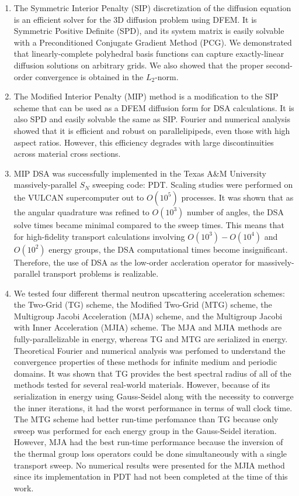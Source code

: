 \begin{enumerate}
\item The Symmetric Interior Penalty (SIP) discretization of the diffusion equation is an efficient solver for the 3D diffusion problem using DFEM. It is Symmetric Positive Definite (SPD), and its system matrix is easily solvable with a Preconditioned Conjugate Gradient Method (PCG). We demonstrated that linearly-complete polyhedral basis functions can capture exactly-linear diffusion solutions on arbitrary grids. We also showed that the proper second-order convergence is obtained in the $L_2$-norm.
\item The Modified Interior Penalty (MIP) method is a modification to the SIP scheme that can be used as a DFEM diffusion form for DSA calculations. It is also SPD and easily solvable the same as SIP. Fourier and numerical analysis showed that it is efficient and robust on parallelipipeds, even those with high aspect ratios. However, this efficiency degrades with large discontinuities across material cross sections.
\item MIP DSA was successfully implemented in the Texas A\&M University massively-parallel $S_N$ sweeping code: PDT. Scaling studies were performed on the VULCAN supercomputer out to $O(10^5)$ processes. It was shown that as the angular quadrature was refined to $O(10^3)$ number of angles, the DSA solve times became minimal compared to the sweep times. This means that for high-fidelity transport calculations involving $O(10^3) - O(10^4)$ and $O(10^2)$ energy groups, the DSA computational times become insignificant. Therefore, the use of DSA as the low-order accleration operator for massively-parallel transport problems is realizable.
\item We tested four different thermal neutron upscattering acceleration schemes: the Two-Grid (TG) scheme, the Modified Two-Grid (MTG) scheme, the Multigroup Jacobi Acceleration (MJA) scheme, and the Multigroup Jacobi with Inner Acceleration (MJIA) scheme. The MJA and MJIA methods are fully-parallelizable in energy, whereas TG and MTG are serialized in energy. Theoretical Fourier and numerical analysis was perfomed to understand the convergence properties of these methods for infinite medium and periodic domains. It was shown that TG provides the best spectral radius of all of the methods tested for several real-world materials. However, because of its serialization in energy using Gauss-Seidel along with the necessity to converge the inner iterations, it had the worst performance in terms of wall clock time. The MTG scheme had better run-time perfomance than TG because only sweep was performed for each energy group in the Gauss-Seidel iteration. However, MJA had the best run-time performance because the inversion of the thermal group loss operators could be done simultaneously with a single transport sweep. No numerical results were presented for the MJIA method since its implementation in PDT had not been completed at the time of this work.
\end{enumerate}

